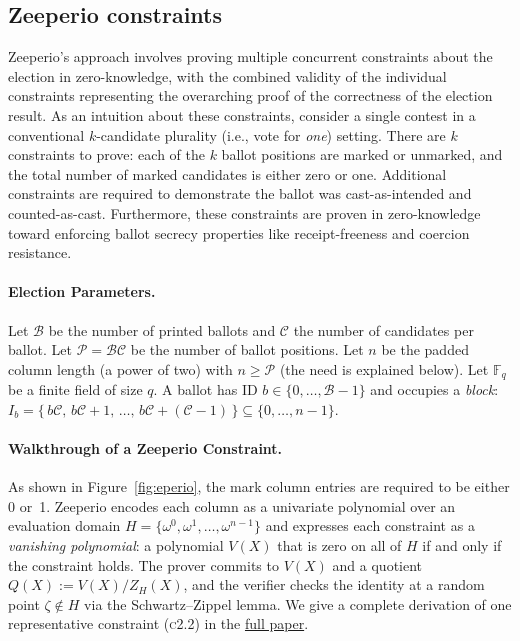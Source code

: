 \subsection{Zeeperio constraints}

Zeeperio's approach involves proving multiple concurrent constraints about the election in zero-knowledge, with the combined validity of the individual constraints representing the overarching proof of the correctness of the election result. As an intuition about these constraints, consider a single contest in a conventional $k$-candidate plurality (i.e., vote for {\em one}) setting. There are $k$ constraints to prove: each of the $k$ ballot positions are marked or unmarked, and the total number of marked candidates is either zero or one. Additional constraints are required to demonstrate the ballot was cast-as-intended and counted-as-cast. Furthermore, these constraints are proven in zero-knowledge toward enforcing ballot secrecy properties like receipt-freeness and coercion resistance.


\paragraph{Election Parameters.}
Let $\mathcal{B}$ be the number of printed ballots and $\mathcal{C}$ the number of candidates per ballot.
Let $\mathcal{P}=\mathcal{B}\mathcal{C}$ be the number of ballot positions.
Let $n$ be the padded column length (a power of two) with $n\ge \mathcal{P}$ (the need is explained below).
Let $\mathbb{F}_q$ be a finite field of size $q$.
A ballot has ID $b\in\{0,\dots,\mathcal{B}-1\}$ and occupies a \emph{block}: $I_b=\{\,b\mathcal{C},\,b\mathcal{C}+1,\,\dots,\,b\mathcal{C}+(\mathcal{C}-1)\,\}\subseteq\{0,\dots,n-1\}.$

\paragraph{Walkthrough of a Zeeperio Constraint.}

As shown in Figure~\ref{fig:eperio}, the mark column entries are required to be either
0 or~1. Zeeperio encodes each column as a univariate polynomial over an
evaluation domain $H = \{\omega^0, \omega^1, \ldots, \omega^{n-1}\}$
and expresses each constraint as a \emph{vanishing polynomial}: a
polynomial $V(X)$ that is zero on all of $H$ if and only if the
constraint holds. The prover commits to $V(X)$ and a quotient
$Q(X) := V(X)/Z_H(X)$, and the verifier checks the identity at a
random point $\zeta \notin H$ via the Schwartz--Zippel lemma.
We give a complete derivation of one representative constraint
(\textsc{c2.2}) in the \href{https://eprint.iacr.org/2026/565}{full paper}.

